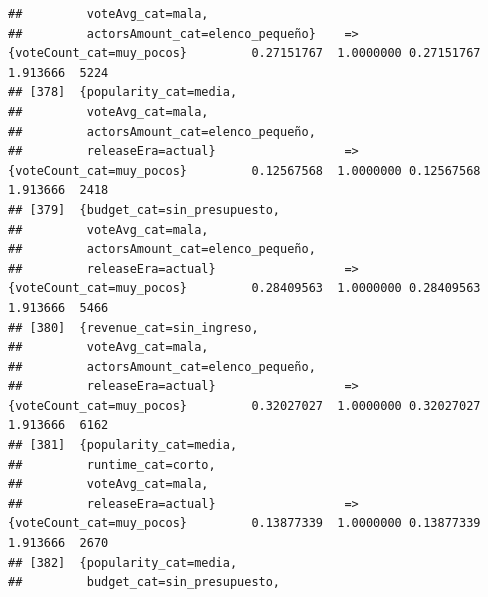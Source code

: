 \documentclass[
]{article}
\begin{document}
\begin{verbatim}
##         voteAvg_cat=mala,                                                                                                       
##         actorsAmount_cat=elenco_pequeño}    => {voteCount_cat=muy_pocos}         0.27151767  1.0000000 0.27151767 1.913666  5224
## [378]  {popularity_cat=media,                                                                                                   
##         voteAvg_cat=mala,                                                                                                       
##         actorsAmount_cat=elenco_pequeño,                                                                                        
##         releaseEra=actual}                  => {voteCount_cat=muy_pocos}         0.12567568  1.0000000 0.12567568 1.913666  2418
## [379]  {budget_cat=sin_presupuesto,                                                                                             
##         voteAvg_cat=mala,                                                                                                       
##         actorsAmount_cat=elenco_pequeño,                                                                                        
##         releaseEra=actual}                  => {voteCount_cat=muy_pocos}         0.28409563  1.0000000 0.28409563 1.913666  5466
## [380]  {revenue_cat=sin_ingreso,                                                                                                
##         voteAvg_cat=mala,                                                                                                       
##         actorsAmount_cat=elenco_pequeño,                                                                                        
##         releaseEra=actual}                  => {voteCount_cat=muy_pocos}         0.32027027  1.0000000 0.32027027 1.913666  6162
## [381]  {popularity_cat=media,                                                                                                   
##         runtime_cat=corto,                                                                                                      
##         voteAvg_cat=mala,                                                                                                       
##         releaseEra=actual}                  => {voteCount_cat=muy_pocos}         0.13877339  1.0000000 0.13877339 1.913666  2670
## [382]  {popularity_cat=media,                                                                                                   
##         budget_cat=sin_presupuesto,                                                                                             

\end{verbatim}
\end{document}

